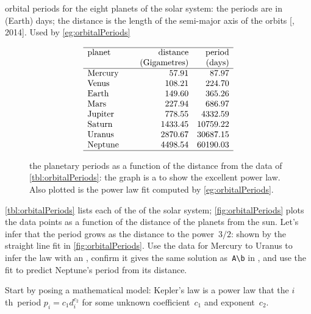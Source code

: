 \begin{example} \label{eg:orbitalPeriods}
\begin{table}
\caption{orbital periods for the eight planets of the solar system: the periods are in (Earth) days; the distance is the length of the semi-major axis of the orbits [, 2014].
Used by \autoref{eg:orbitalPeriods}}
\label{tbl:orbitalPeriods}
\begin{equation*}
\begin{array}{p{12ex}rr} \hline
planet&\text{distance}&\text{period}\\
&\text{(Gigametres)}&\text{(days)}\\\hline
Mercury& 57.91 & 87.97 \\
Venus& 108.21 & 224.70 \\
Earth& 149.60& 365.26\\
Mars& 227.94& 686.97\\
Jupiter& 778.55& 4332.59\\
Saturn& 1433.45& 10759.22\\
Uranus& 2870.67& 30687.15\\
Neptune& 4498.54& 60190.03\\\hline
\end{array}
\end{equation*}
\end{table}%
\begin{figure}
\centering

\caption{the planetary periods as a function of the distance from the data of \autoref{tbl:orbitalPeriods}: the graph is a  to show the excellent power law.  
Also plotted is the power law fit computed by \autoref{eg:orbitalPeriods}.}
\label{fig:orbitalPeriods}
\end{figure}%
\autoref{tbl:orbitalPeriods} lists each  of the  of the solar system; \autoref{fig:orbitalPeriods} plots the data points as a function of the distance of the planets from the sun.
Let's infer  that the period grows as the distance to the power~\(3/2\): shown by the straight line fit in \autoref{fig:orbitalPeriods}.
Use the data for Mercury to Uranus to infer the law with an \svd, confirm it gives the same solution as~\verb|A\b| in \script, and use the fit to predict Neptune's period from its distance.
\begin{solution} 
Start by posing a mathematical model: Kepler's law is a power law that the \(i\)th~period \(p_i=c_1d_i^{c_2}\) for some unknown coefficient~\(c_1\) and exponent~\(c_2\).  

\end{solution}
\end{example}
